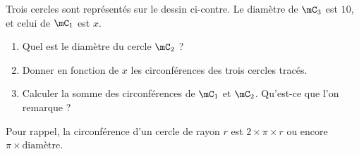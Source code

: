 
\begin{exercice}\label{exo2smath-0156}

%   

    \begin{multicols}{2}
    Trois cercles sont représentés sur le dessin ci-contre. Le diamètre de \( \mC_3\) est \( 10\), et celui de \( \mC_1\) est \( x\).

    \begin{enumerate}
        \item
            Quel est le diamètre du cercle \( \mC_2\) ?
        \item
            Donner en fonction de \( x\) les circonférences des trois cercles tracés.
        \item   \label{ItemCUFLooIdJOVd}
            Calculer la somme des circonférences de \( \mC_1\) et \( \mC_2\). Qu'est-ce que l'on remarque ?
    \end{enumerate}

    \columnbreak

    \begin{center}
   
    \end{center}
    \end{multicols}
    Pour rappel, la circonférence d'un cercle de rayon \( r\) est \( 2\times \pi\times r\) ou encore \( \pi\times \text{diamètre}\).

\end{exercice}
